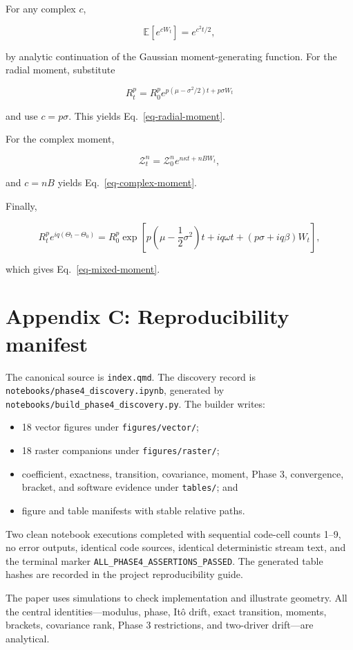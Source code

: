 \documentclass[
  english,
  10pt,
  letterpaper,
  DIV=11,
  numbers=noendperiod]{scrartcl}
\providecommand{\tightlist}{%
  \setlength{\itemsep}{0pt}\setlength{\parskip}{0pt}}
\begin{document}
For any complex \(c\),

\[
\mathbb E[e^{cW_t}]=e^{c^2t/2},
\]

by analytic continuation of the Gaussian moment-generating function. For
the radial moment, substitute

\[
R_t^p
=R_0^p
e^{p(\mu-\sigma^2/2)t+p\sigma W_t}
\]

and use \(c=p\sigma\). This yields Eq.~\ref{eq-radial-moment}.

For the complex moment,

\[
\mathcal Z_t^n
=
\mathcal Z_0^n e^{n\kappa t+nBW_t},
\]

and \(c=nB\) yields Eq.~\ref{eq-complex-moment}.

Finally,

\[
R_t^p e^{iq(\Theta_t-\Theta_0)}
=
R_0^p
\exp\!\left[
p\left(\mu-\frac12\sigma^2\right)t
+iq\omega t
+\left(p\sigma+iq\beta\right)W_t
\right],
\]

which gives Eq.~\ref{eq-mixed-moment}.

\section{Appendix C: Reproducibility
manifest}\label{sec-appendix-reproducibility}

The canonical source is \texttt{index.qmd}. The discovery record is
\texttt{notebooks/phase4\_discovery.ipynb}, generated by
\texttt{notebooks/build\_phase4\_discovery.py}. The builder writes:

\begin{itemize}
\tightlist
\item
  18 vector figures under \texttt{figures/vector/};
\item
  18 raster companions under \texttt{figures/raster/};
\item
  coefficient, exactness, transition, covariance, moment, Phase 3,
  convergence, bracket, and software evidence under \texttt{tables/};
  and
\item
  figure and table manifests with stable relative paths.
\end{itemize}

Two clean notebook executions completed with sequential code-cell counts
1--9, no error outputs, identical code sources, identical deterministic
stream text, and the terminal marker
\texttt{ALL\_PHASE4\_ASSERTIONS\_PASSED}. The generated table hashes are
recorded in the project reproducibility guide.

The paper uses simulations to check implementation and illustrate
geometry. All the central identities---modulus, phase, Itô drift, exact
transition, moments, brackets, covariance rank, Phase 3 restrictions,
and two-driver drift---are analytical.
\end{document}
